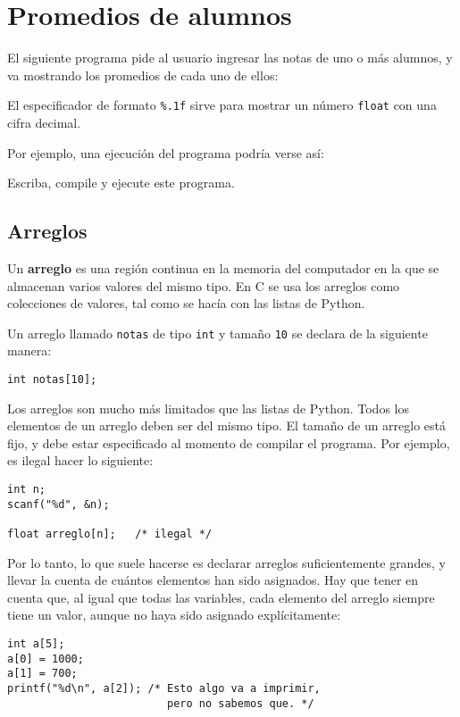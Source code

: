 \section{Promedios de alumnos}

El siguiente programa pide al usuario ingresar las notas de uno o más
alumnos, y va mostrando los promedios de cada uno de ellos:

El especificador de formato \lstinline!%.1f! sirve para mostrar un
número \lstinline!float! con una cifra decimal.

Por ejemplo, una ejecución del programa podría verse así:

Escriba, compile y ejecute este programa.

\subsection{Arreglos}

Un \textbf{arreglo} es una región continua en la memoria del computador
en la que se almacenan varios valores del mismo tipo. En C se usa los
arreglos como colecciones de valores, tal como se hacía con las listas
de Python.

Un arreglo llamado \lstinline!notas! de tipo \lstinline!int! y tamaño
\lstinline!10! se declara de la siguiente manera:

\begin{lstlisting}
int notas[10];
\end{lstlisting}

Los arreglos son mucho más limitados que las listas de Python. Todos los
elementos de un arreglo deben ser del mismo tipo. El tamaño de un
arreglo está fijo, y debe estar especificado al momento de compilar el
programa. Por ejemplo, es ilegal hacer lo siguiente:

\begin{lstlisting}
int n;
scanf("%d", &n);

float arreglo[n];   /* ilegal */
\end{lstlisting}

Por lo tanto, lo que suele hacerse es declarar arreglos suficientemente
grandes, y llevar la cuenta de cuántos elementos han sido asignados. Hay
que tener en cuenta que, al igual que todas las variables, cada elemento
del arreglo siempre tiene un valor, aunque no haya sido asignado
explícitamente:

\begin{lstlisting}
int a[5];
a[0] = 1000;
a[1] = 700;
printf("%d\n", a[2]); /* Esto algo va a imprimir,
                         pero no sabemos que. */
\end{lstlisting}


